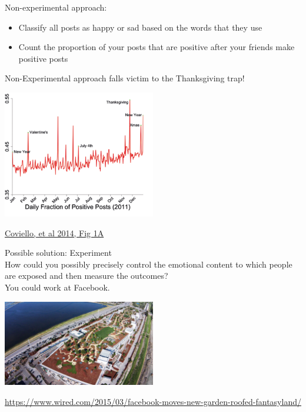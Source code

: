 \documentclass[aspectratio=169]{beamer}
\begin{document}
\begin{frame}

Non-experimental approach: \pause
\begin{itemize}
\item Classify all posts as happy or sad based on the words that they use \pause
\item Count the proportion of your posts that are positive after your friends make positive posts
\end{itemize}

\end{frame}
\begin{frame}

Non-Experimental approach falls victim to the Thanksgiving trap! \pause

\begin{center}
\includegraphics[width=0.5\textwidth]{figures/coviello_detecting_2014_fig1a}
\end{center}

\href{https://doi.org/10.1371/journal.pone.0090315}{Coviello, et al 2014, Fig 1A} 

\end{frame}
\begin{frame}

Possible solution: Experiment\\  \pause
How could you possibly precisely control the emotional content to which people are exposed and then measure the outcomes?\pause\\
You could work at Facebook.

\begin{center}
\includegraphics[width=0.5\textwidth]{figures/facebook_hq}
\end{center}

\vfill
\tiny{\url{https://www.wired.com/2015/03/facebook-moves-new-garden-roofed-fantasyland/}}
\end{frame}
\end{document}
